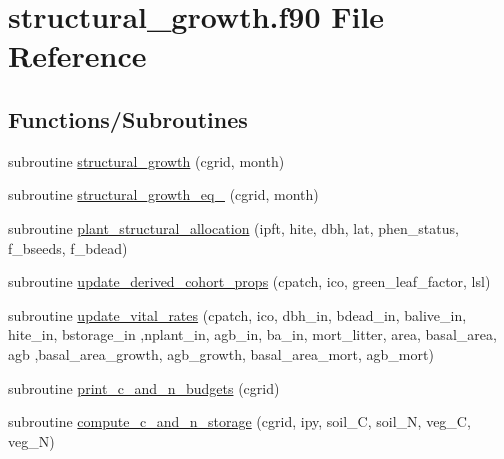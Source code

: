 \hypertarget{structural__growth_8f90}{}\section{structural\+\_\+growth.\+f90 File Reference}
\label{structural__growth_8f90}
\subsection*{Functions/\+Subroutines}
\begin{DoxyCompactItemize}
\item 
subroutine \hyperlink{structural__growth_8f90_a7026b36ce655ecfb0b39b37725e7cba0}{structural\+\_\+growth} (cgrid, month)
\item 
subroutine \hyperlink{structural__growth_8f90_ab7a103c1eca3dc4a1e6646ae50385192}{structural\+\_\+growth\+\_\+eq\+\_} (cgrid, month)
\item 
subroutine \hyperlink{structural__growth_8f90_aeb0b1265e38d3c5ca8e55da40e42dae2}{plant\+\_\+structural\+\_\+allocation} (ipft, hite, dbh, lat, phen\+\_\+status, f\+\_\+bseeds, f\+\_\+bdead)
\item 
subroutine \hyperlink{structural__growth_8f90_a536c2986535dd42c3f2fd77510acf2f3}{update\+\_\+derived\+\_\+cohort\+\_\+props} (cpatch, ico, green\+\_\+leaf\+\_\+factor, lsl)
\item 
subroutine \hyperlink{structural__growth_8f90_a18746b03d74909fea238e464b0f7f513}{update\+\_\+vital\+\_\+rates} (cpatch, ico, dbh\+\_\+in, bdead\+\_\+in, balive\+\_\+in, hite\+\_\+in, bstorage\+\_\+in                                                                                                                               ,nplant\+\_\+in, agb\+\_\+in, ba\+\_\+in, mort\+\_\+litter, area, basal\+\_\+area, agb                                                                                                                                       ,basal\+\_\+area\+\_\+growth, agb\+\_\+growth, basal\+\_\+area\+\_\+mort, agb\+\_\+mort)
\item 
subroutine \hyperlink{structural__growth_8f90_a7f0c8e66b7972204c83052c3968c4bff}{print\+\_\+c\+\_\+and\+\_\+n\+\_\+budgets} (cgrid)
\item 
subroutine \hyperlink{structural__growth_8f90_a5e03a88fee4cb247574e235c96e27716}{compute\+\_\+c\+\_\+and\+\_\+n\+\_\+storage} (cgrid, ipy, soil\+\_\+\+C, soil\+\_\+\+N, veg\+\_\+\+C, veg\+\_\+\+N)
\end{DoxyCompactItemize}


